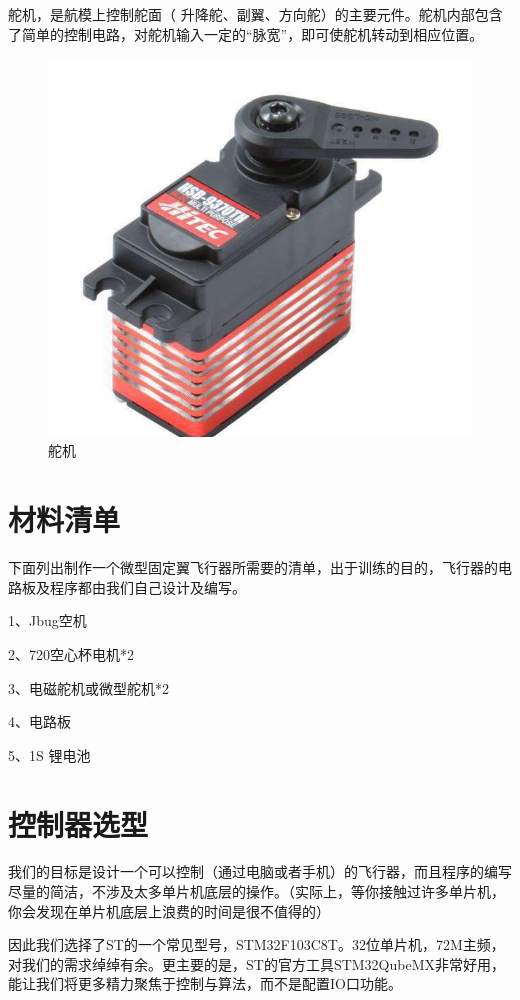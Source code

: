 \documentclass{article}
\begin{document}
舵机，是航模上控制舵面（ 升降舵、副翼、方向舵）的主要元件。舵机内部包含了简单的控制电路，对舵机输入一定的“脉宽”，即可使舵机转动到相应位置。

\begin{figure}[ht]
	\centering
	\includegraphics[scale=0.2]{舵机.jpg}
	\caption{舵机}
	\label{fig:label}
\end{figure}

\section{材料清单}
下面列出制作一个微型固定翼飞行器所需要的清单，出于训练的目的，飞行器的电路板及程序都由我们自己设计及编写。

1、Jbug空机

2、720空心杯电机*2

3、电磁舵机或微型舵机*2

4、电路板

5、1S 锂电池

\section{控制器选型}
我们的目标是设计一个可以控制（通过电脑或者手机）的飞行器，而且程序的编写尽量的简洁，不涉及太多单片机底层的操作。（实际上，等你接触过许多单片机，你会发现在单片机底层上浪费的时间是很不值得的）

因此我们选择了ST的一个常见型号，STM32F103C8T。32位单片机，72M主频，对我们的需求绰绰有余。更主要的是，ST的官方工具STM32QubeMX非常好用，能让我们将更多精力聚焦于控制与算法，而不是配置IO口功能。
\end{document}
